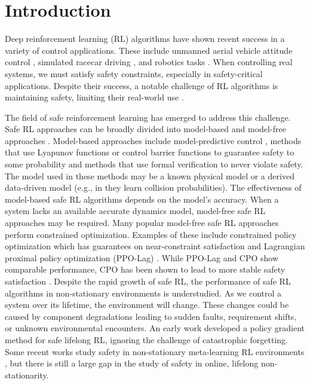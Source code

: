 \section{Introduction} \label{sec:intro}

Deep reinforcement learning (RL) algorithms have shown recent success in a variety of control applications. These include unmanned aerial vehicle attitude control \cite{koch2019reinforcement}, simulated racecar driving \cite{wurman2022outracing}, and robotics tasks \cite{apolinarska2021robotic}. When controlling real systems, we must satisfy safety constraints, especially in safety-critical applications. Despite their success, a notable challenge of RL algorithms is maintaining safety, limiting their real-world use \cite{dulac2021challenges}.  

The field of safe reinforcement learning has emerged to address this challenge. Safe RL approaches can be broadly divided into model-based and model-free approaches \cite{gu2022review}. Model-based approaches include model-predictive control \cite{zanon2020safe}, methods that use Lyapunov functions \cite{berkenkamp2017safe} or control barrier functions \cite{marvi2021cbf} to guarantee safety to some probability \cite{gu2022review} and methods that use formal verification \cite{alshiekh2018sheild} to never violate safety. The model used in these methods may be a known physical model \cite{zanon2020safe} or a derived data-driven model (e.g., in \cite{lutjens2019safe} they learn collision probabilities). The effectiveness of model-based safe RL algorithms depends on the model's accuracy. When a system lacks an available accurate dynamics model, model-free safe RL approaches may be required. Many popular model-free safe RL approaches perform constrained optimization. Examples of these include constrained policy optimization \cite{achiam2017constrained} which has guarantees on near-constraint satisfaction and Lagrangian proximal policy optimization (PPO-Lag) \cite{ray2019benchmarking}. While PPO-Lag and CPO show comparable performance, CPO has been shown to lead to more stable safety satisfaction \cite{ji2023safety}. Despite the rapid growth of safe RL, the performance of safe RL algorithms in non-stationary environments is understudied. As we control a system over its lifetime, the environment will change. These changes could be caused by component degradations leading to sudden faults, requirement shifts, or unknown environmental encounters. An early work \cite{ammar2015safe} developed a policy gradient method for safe lifelong RL, ignoring the challenge of catastrophic forgetting. Some recent works study safety in non-stationary meta-learning RL environments \cite{chen2021context}, but there is still a large gap in the study of safety in online, lifelong non-stationarity. 

